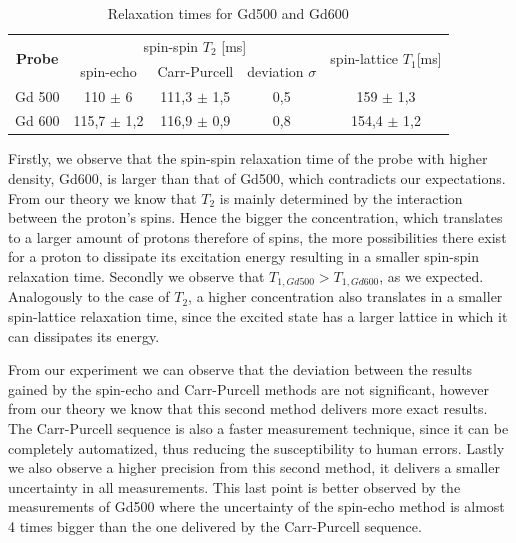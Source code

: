 \begin{table}[!htbp]
 \begin{center}
  \caption{Relaxation times for Gd500 and Gd600}
  \label{tab: relaxation times}
  \begin{tabular}{|c||c|c|c|c|}
	\hline
	\multirow{2}{*}{\textbf{Probe}} & \multicolumn{3}{c}{spin-spin $T_2$ [ms]} &\multirow{2}{*}{ spin-lattice $T_1$[ms]}\\
	& spin-echo & Carr-Purcell & deviation $\sigma$&\\
	\hline
	\hline	
	Gd 500 & 110 $\pm$ 6 & 111,3 $\pm$ 1,5 & 0,5 & 159 $\pm$ 1,3 \\
	Gd 600 & 115,7 $\pm$ 1,2 & 116,9 $\pm$ 0,9 & 0,8 & 154,4 $\pm$ 1,2 \\
	\hline
  \end{tabular}
 \end{center}
\end{table}

Firstly, we observe that the spin-spin relaxation time of the probe with higher density, Gd600, is larger than that of Gd500, which contradicts our expectations. From our theory we know that $T_2$ is mainly determined by the interaction between the proton's spins. Hence the bigger the concentration, which translates to a larger amount of protons therefore of spins, the  more possibilities there exist for a proton to dissipate its excitation energy resulting in a smaller spin-spin relaxation time. 
Secondly we observe that $T_{1, Gd500} > T_{1,Gd600}$, as we expected. Analogously to the case of $T_2$, a higher concentration also translates in a smaller spin-lattice relaxation time, since the excited state has a larger lattice in which it can dissipates its energy.


From our experiment we can observe that the deviation between the results gained by the spin-echo and Carr-Purcell methods are not significant, however from our theory we know that this second method delivers more exact results. The Carr-Purcell sequence is also a faster measurement technique, since it can be completely automatized, thus reducing the susceptibility to human errors. Lastly we also observe a higher precision from this second method, it delivers a smaller uncertainty in all measurements. This last point is better observed by the measurements of Gd500 where the uncertainty of the spin-echo method is almost 4 times bigger than the one delivered by the Carr-Purcell sequence. 

